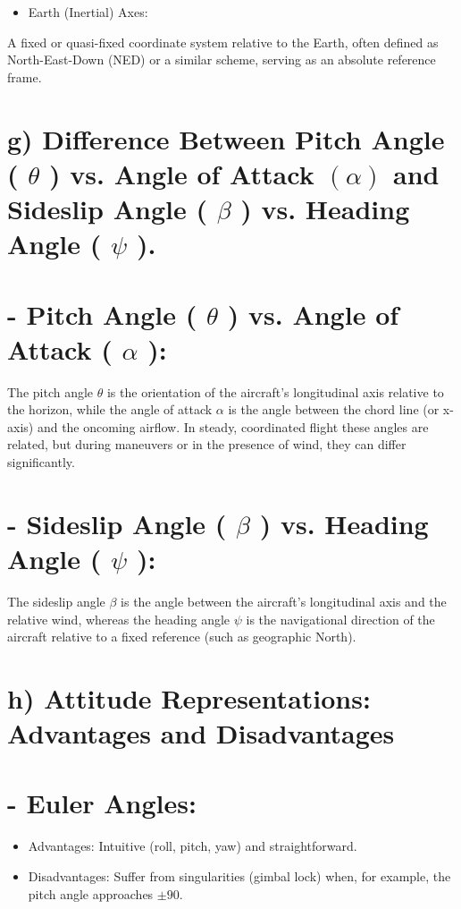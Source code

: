 \documentclass[10pt]{article}
\begin{document}
\begin{itemize}
  \item Earth (Inertial) Axes:
\end{itemize}

A fixed or quasi-fixed coordinate system relative to the Earth, often defined as North-East-Down (NED) or a similar scheme, serving as an absolute reference frame.

\section*{g) Difference Between Pitch Angle ( $\theta$ ) vs. Angle of Attack $(\alpha)$ and Sideslip Angle ( $\beta$ ) vs. Heading Angle ( $\psi$ ).}
\section*{- Pitch Angle ( $\theta$ ) vs. Angle of Attack ( $\alpha$ ):}
The pitch angle $\theta$ is the orientation of the aircraft's longitudinal axis relative to the horizon, while the angle of attack $\alpha$ is the angle between the chord line (or x-axis) and the oncoming airflow. In steady, coordinated flight these angles are related, but during maneuvers or in the presence of wind, they can differ significantly.

\section*{- Sideslip Angle ( $\beta$ ) vs. Heading Angle ( $\psi$ ):}
The sideslip angle $\beta$ is the angle between the aircraft's longitudinal axis and the relative wind, whereas the heading angle $\psi$ is the navigational direction of the aircraft relative to a fixed reference (such as geographic North).

\section*{h) Attitude Representations: Advantages and Disadvantages}
\section*{- Euler Angles:}
\begin{itemize}
  \item Advantages: Intuitive (roll, pitch, yaw) and straightforward.
  \item Disadvantages: Suffer from singularities (gimbal lock) when, for example, the pitch angle approaches $\pm 90$.
\end{itemize}
\end{document}
